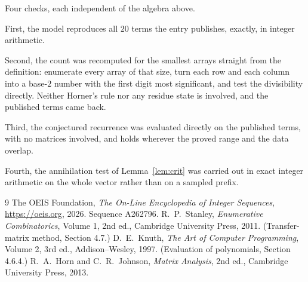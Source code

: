 \documentclass[11pt,a4paper]{article}
\theoremstyle{plain}
\theoremstyle{definition}
\begin{document}
Four checks, each independent of the algebra above.

First, the model reproduces all $20$ terms the entry publishes, exactly, in integer
arithmetic.

Second, the count was recomputed for the smallest arrays straight from the definition:
enumerate every array of that size, turn each row and each column into a base-$2$ number with
the first digit most significant, and test the divisibility directly. Neither Horner's rule nor
any residue state is involved, and the published terms came back.

Third, the conjectured recurrence was evaluated directly on the published terms, with no
matrices involved, and holds wherever the proved range and the data overlap.

Fourth, the annihilation test of Lemma~\ref{lem:crit} was carried out in exact integer
arithmetic on the whole vector rather than on a sampled prefix.

\begin{thebibliography}{9}
 The OEIS Foundation, \emph{The On-Line Encyclopedia of Integer
Sequences}, \url{https://oeis.org}, 2026. Sequence A262796.
 R.~P.~Stanley, \emph{Enumerative Combinatorics}, Volume 1, 2nd ed.,
Cambridge University Press, 2011. (Transfer-matrix method, Section 4.7.)
 D.~E.~Knuth, \emph{The Art of Computer Programming}, Volume 2, 3rd ed.,
Addison--Wesley, 1997. (Evaluation of polynomials, Section 4.6.4.)
 R.~A.~Horn and C.~R.~Johnson, \emph{Matrix Analysis}, 2nd ed., Cambridge
University Press, 2013.
\end{thebibliography}
\end{document}
